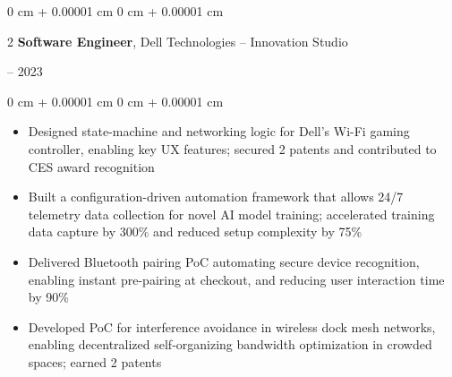 \documentclass[10pt, letterpaper]{article}
\newenvironment{highlights}{
    \begin{itemize}[
        topsep=0.10 cm,
        parsep=0.10 cm,
        partopsep=0pt,
        itemsep=0pt,
        leftmargin=0 cm + 10pt
    ]
}{
    \end{itemize}
} %
\newenvironment{onecolentry}{
    \begin{adjustwidth}{
        0 cm + 0.00001 cm
    }{
        0 cm + 0.00001 cm
    }
}{
    \end{adjustwidth}
} %
\newenvironment{twocolentry}[2][]{
    \onecolentry
    \def\secondColumn{#2}
    \setcolumnwidth{\fill, 4.5 cm}
    \begin{paracol}{2}
}{
    \switchcolumn \raggedleft \secondColumn
    \end{paracol}
    \endonecolentry
} %
\begin{document}
  \begin{twocolentry}{2021 – 2023}{\textbf{Software Engineer}, Dell Technologies – Innovation Studio}
  \end{twocolentry}
  \vspace{0.1cm}
  \begin{onecolentry}
    \begin{highlights}
      \item Designed state-machine and networking logic for Dell’s Wi-Fi gaming controller, enabling key UX features; secured 2 patents and contributed to CES award recognition
      \item Built a configuration-driven automation framework that allows 24/7 telemetry data collection for novel AI model training; accelerated training data capture by 300\% and reduced setup complexity by 75\%
      \item Delivered Bluetooth pairing PoC automating secure device recognition, enabling instant pre-pairing at checkout, and reducing user interaction time by 90\%
      \item Developed PoC for interference avoidance in wireless dock mesh networks, enabling decentralized self-organizing bandwidth optimization in crowded spaces; earned 2 patents
    \end{highlights}
  \end{onecolentry}

  \vspace{0.2cm}
\end{document}
